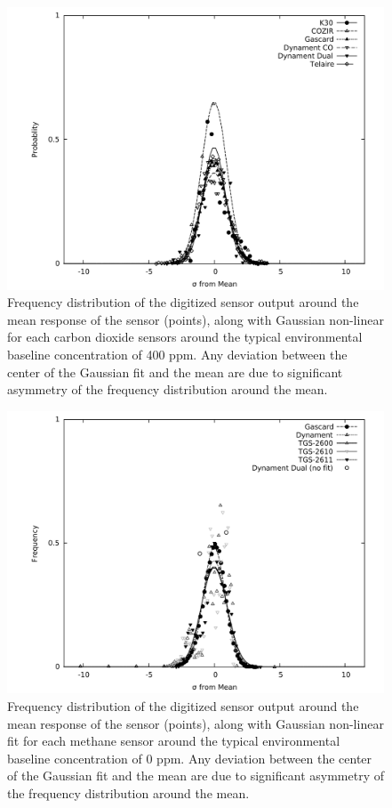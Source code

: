 \documentclass[preprint,sort&compress]{elsarticle}
\begin{document}
	
			\begin{figure}[!t]
				\centering
				\includegraphics[width=\columnwidth]{honey7.pdf}
				\caption{Frequency distribution of the digitized sensor output around the mean response of the sensor (points), along with Gaussian non-linear for each carbon dioxide sensors around the typical environmental baseline concentration of 400 ppm.
				Any deviation between the center of the Gaussian fit and the mean are due to significant asymmetry of the frequency distribution around the mean.}
				\label{fig:gaussco2}
			\end{figure}
			
			\begin{figure}[!t]
				\centering
				\includegraphics[width=\columnwidth]{honey8.pdf}
				\caption{Frequency distribution of the digitized sensor output around the mean response of the sensor (points), along with Gaussian non-linear fit for each methane sensor around the typical environmental baseline concentration of 0 ppm.
				Any deviation between the center of the Gaussian fit and the mean are due to significant asymmetry of the frequency distribution around the mean.}
				\label{fig:gaussch4}
			\end{figure}
			
\end{document}
